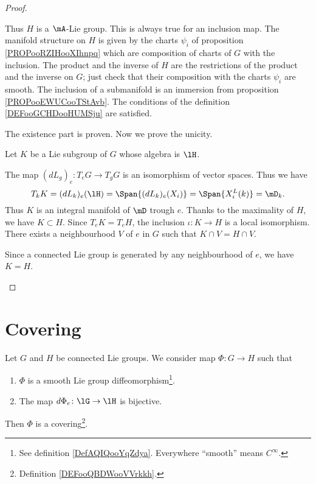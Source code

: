\begin{proof}
\begin{subproof}
		Thus \( H\) is a \( \mA\)-Lie group.
		This is always true for an inclusion map.
		The manifold structure on \( H\) is given by the charts \( \psi_i\) of proposition \ref{PROPooRZIHooXIhnpq} which are composition of charts of \( G\) with the inclusion. The product and the inverse of \( H\) are the restrictions of the product and the inverse on \( G\); just check that their composition with the charts \( \psi_i\) are smooth.
		The inclusion of a submanifold is an immersion from proposition \ref{PROPooEWUCooTStAvb}.
		The conditions of the definition \ref{DEFooGCHDooHUMSju} are satisfied.
	\end{subproof}
	The existence part is proven. Now we prove the unicity.

	Let \( K\) be a Lie subgroup of \( G\) whose algebra is \( \lH\).
	\begin{subproof}
		\spitem[\( T_kK=\mD_k\)]
		The map \( (dL_g)_e\colon T_eG\to T_gG\) is an isomorphism of vector spaces. Thus we have
		\begin{equation}
			T_kK=(dL_k)_e(\lH)=\Span\{ (dL_k)_e(X_i) \}=\Span\{ X_i^L(k) \}=\mD_k.
		\end{equation}
		\spitem[Maximality]
		Thus \( K\) is an integral manifold of \( \mD\) trough \( e\). Thanks to the maximality of \( H\), we have \( K\subset H\). Since \( T_eK=T_eH\), the inclusion \( \iota\colon K\to H\) is a local isomorphism. There exists a neighbourhood \( V\) of \( e\) in \( G\) such that \( K\cap V=H\cap V\).

		Since a connected Lie group is generated by any neighbourhood of \( e\), we have \( K=H\).
	\end{subproof}
\end{proof}


\section{Covering}

\begin{lemma}     \label{LEMooSYVQooTjkgBL}
	Let \( G\) and \( H\) be connected Lie groups. We consider map \( \Phi\colon G\to H\) such that
	\begin{enumerate}
		\item
		      \( \Phi\) is a smooth Lie group diffeomorphism\footnote{See definition \ref{DefAQIQooYqZdya}. Everywhere ``smooth'' means \(  C^{\infty}\).}.
		\item
		      The map \( d\Phi_e\colon \lG\to \lH\) is bijective.
	\end{enumerate}
	Then \( \Phi\) is a covering\footnote{Definition \ref{DEFooQBDWooVVrkkh}.}.
\end{lemma}

